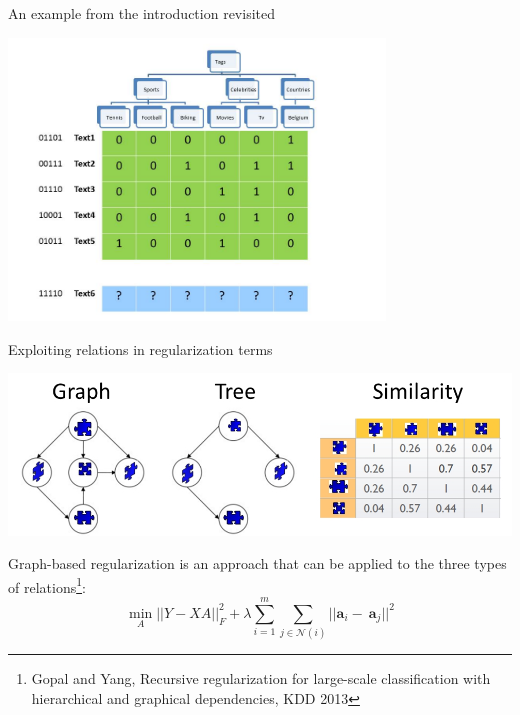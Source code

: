 \documentclass[]{beamer}
\renewcommand{\vec}[1]{\boldsymbol{#1}}
\begin{document}
\begin{frame}{An example from the introduction revisited}
\begin{center}
\includegraphics[width=0.75\textwidth,trim = 0 0 100 0,clip]{Figures/pictures/Slide5}
\end{center}
\end{frame}

\begin{frame}{Exploiting relations in regularization terms}

\begin{center}
\includegraphics[width=\textwidth]{pics/targetrelations}
\end{center} \pause 

Graph-based regularization is an approach that can be applied to the three types of relations\footnote{Gopal and Yang, Recursive regularization for large-scale classification with hierarchical
and graphical dependencies, KDD 2013}: 
\begin{equation*}
\min_A ||Y - XA ||^2_F + \lambda \sum_{i=1}^m \sum_{j \in \mathcal{N}(i)} ||\vec{a}_i - \ \vec{a}_j||^2 
\end{equation*}

\end{frame}
\end{document}
